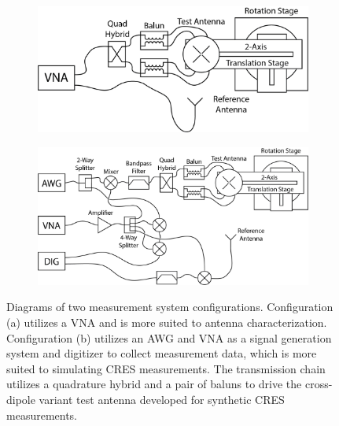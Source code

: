 \begin{figure}[htbp]
    \centering
    \begin{subfigure}[b]{0.43\textwidth}
        \centering
        \includegraphics[width=1\textwidth]{figs/Chapter-5/230409_vna_sys_diag.png}
        \caption{\label{fig:vna-meas-sys}}
    \end{subfigure}
    \hfill
    \begin{subfigure}[b]{0.52\textwidth}
        \centering
        \includegraphics[width=1\textwidth]{figs/Chapter-5/230408_detail_meas_sys_diag.png}
        \caption{\label{fig:dig-meas-sys}}
    \end{subfigure}
    \hfill
    \caption{\label{fig:meas-sys-diagrams}Diagrams of two measurement system configurations. Configuration (a) utilizes a VNA and is more suited to antenna characterization. Configuration (b) utilizes an AWG and VNA as a signal generation system and digitizer to collect measurement data, which is more suited to simulating CRES measurements. The transmission chain utilizes a quadrature hybrid and a pair of baluns to drive the cross-dipole variant test antenna developed for synthetic CRES measurements.}
\end{figure}

